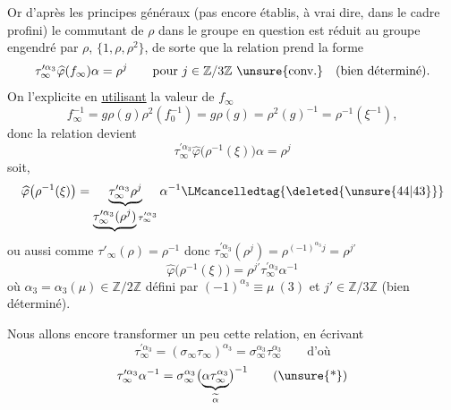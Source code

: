 

Or d'après les principes généraux (pas encore établis, à vrai dire, dans le cadre profini) le commutant de $\rho$ dans le groupe en question est réduit au groupe engendré par $\rho$, $\{1,\rho,\rho^2\}$, de sorte que la relation \unsure{(*)} prend la forme
\[
\tau_\infty^{\prime\alpha_3}\widehat{\varphi}(f_\infty)\alpha=\rho^j
\qquad\text{pour }j\in\mathbb Z/3\mathbb Z\ \unsure{\text{conv.}}
\quad\text{(bien déterminé)}.
\]
On l'explicite en \uline{utilisant} la valeur de $f_\infty$
\[
f_\infty^{-1}=g\rho(g)\rho^2(f_0^{-1})
=g\rho(g)=\rho^2(g)^{-1}=\rho^{-1}(\xi^{-1}),
\]
donc la relation  devient
\[
\tau_\infty^{\prime\alpha_3}\widehat{\varphi}\bigl(\rho^{-1}(\xi)\bigr)\alpha=\rho^j
\]
soit, 
\[
\widehat{\varphi}\bigl(\rho^{-1}(\xi)\bigr)
=\underbrace{\tau_\infty^{\prime\alpha_3}\rho^j}_{\underbrace{\tau_\infty^{\prime\alpha_3}(\rho^j)}\tau_\infty^{\prime\alpha_3}}\alpha^{-1}
\LMcancelledtag{\deleted{\unsure{44|43}}}
\]
ou aussi
\deleted{\[
\widehat{\varphi}\bigl(\rho^{-1}(\xi^{-1})\bigr)=\alpha\rho^{-j}\tau_\infty^{\prime\alpha_3}.
\tag{\unsure{44 bis|43 bis}}
\]}
comme $\tau'_\infty(\rho)=\rho^{-1}$ donc
$\tau_\infty^{\prime\alpha_3}(\rho^j)=\rho^{(-1)^{\alpha_3}j}=\rho^{j'}$
\[
\widehat{\varphi}\bigl(\rho^{-1}(\xi)\bigr)=\rho^{j'}\tau_\infty^{\prime\alpha_3}\alpha^{-1}
\tag{44}
\]
où $\alpha_3=\alpha_3(\mu)\in\mathbb Z/2\mathbb Z$ défini par $(-1)^{\alpha_3}\equiv\mu\ (3)$ et $j'\in\mathbb Z/3\mathbb Z$ (bien déterminé).

Nous allons encore transformer un peu cette relation, en écrivant
\[
\tau_\infty^{\prime\alpha_3}=(\sigma_\infty\tau_\infty)^{\alpha_3}=\sigma_\infty^{\alpha_3}\tau_\infty^{\alpha_3}
\qquad\text{d'où}
\]
\[
\tau_\infty^{\prime\alpha_3}\alpha^{-1}=\sigma_\infty^{\alpha_3}\bigl(\underbrace{\alpha\tau_\infty^{\alpha_3}}_{\widetilde\alpha}\bigr)^{-1}
\tag{\unsure{*}}
\]


